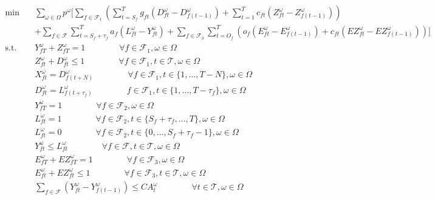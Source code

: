 \documentclass[12pt]{article}
\begin{document}
	\begin{subequations}
		\begin{align}
			\min \quad & \sum_{\omega \in \Omega} p^\omega \bigg[ \sum_{f \in \mathcal{F}_1} \left(\sum_{t = S_f}^T g_{ft}(D_{ft}^\omega - D_{f(t-1)}^\omega) + \sum_{t = 1}^T c_{ft}(Z_{ft}^\omega - Z_{f(t-1)}^\omega) \right) \nonumber\\
			& +\sum_{f \in \mathcal{F}}\sum_{t = S_f+\tau_f}^T a_{f}(L_{ft}^\omega - Y_{ft}^\omega) + \sum_{f \in \mathcal{F}_3} \sum_{t = O_f}^{T} \left(o_{f}(E_{ft}^\omega - E_{f(t-1)}^\omega) + c_{ft}(EZ_{ft}^\omega - EZ_{f(t-1)}^\omega)\right) \bigg]\\
			\text{s.t.} \quad &  Y_{fT}^\omega + Z_{fT}^\omega = 1 \qquad \qquad \forall f \in \mathcal{F}_1, \omega \in \Omega \label{cons:cancelORfly}\\
			& Z_{ft}^\omega + D_{ft}^\omega \leq 1 \qquad \qquad \forall f \in \mathcal{F}_1, t \in \mathcal{T}, \omega \in \Omega \label{cons:cancelORplan}\\
			& X_{ft}^\omega = D_{f(t+N)}^\omega \qquad \qquad \forall f \in \mathcal{F}_1, t \in \{1, \dots, T-N\}, \omega \in \Omega \label{cons:planahead}\\
			& D_{ft}^\omega = L_{f(t + \tau_f)}^\omega \qquad \qquad f \in \mathcal{F}_1, t \in \{1, \dots, T - \tau_{f}\}, \omega \in \Omega \label{cons:depLag}\\
			& Y_{fT}^\omega = 1 \qquad \qquad \forall f \in \mathcal{F}_2, \omega \in \Omega \label{cons:mustLand}\\
			& L_{ft}^\omega = 1 \qquad \qquad \forall f \in \mathcal{F}_2, t \in \{S_f+\tau_f, \dots, T\}, \omega \in \Omega \label{cons:mustArr}\\
			& L_{ft}^\omega = 0 \qquad \qquad \forall f \in \mathcal{F}_2, t \in \{0, \dots, S_f+\tau_f-1\}, \omega \in \Omega \label{cons:cannotArr}\\
			& Y_{ft}^\omega \leq L_{ft}^\omega \qquad \qquad \forall f \in \mathcal{F}, t \in \mathcal{T}, \omega \in \Omega \label{cons:arrland}\\
			& E_{fT}^\omega + EZ_{fT}^\omega = 1 \qquad \qquad \forall f \in \mathcal{F}_3, \omega \in \Omega \label{cons:cancelORto}\\
			& E_{ft}^\omega + EZ_{ft}^\omega \leq 1 \qquad \qquad \forall f \in \mathcal{F}_3, t \in \mathcal{T}, \omega \in \Omega \label{cons:cancelTO2}\\
			& \sum_{f \in \mathcal{F}}\left(Y_{ft}^\omega - Y_{f(t-1)}^\omega\right) \leq CA_{t}^\omega \qquad \qquad \forall t \in \mathcal{T}, \omega \in \Omega \label{cons:arrCap}\\

\end{align}
\end{subequations}
\end{document}
